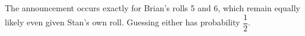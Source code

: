 The announcement occurs exactly for Brian's rolls 5 and 6, which remain equally likely even given Stan's own roll. Guessing either has probability $\boxed{\dfrac{1}{2}}$.
